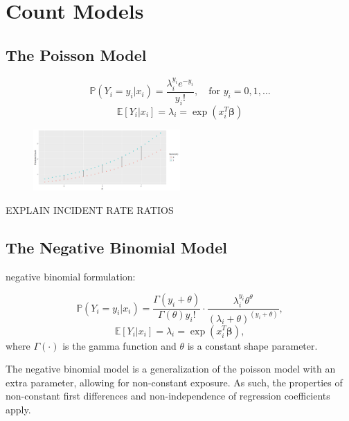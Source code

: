 \documentclass[jou, apacite]{apa6}
\begin{document}
\section{Count Models}

\subsection{The Poisson Model}

\begin{equation} \label{pois1}
\mathbb{P}(Y_i = y_i|x_i) = \dfrac{\lambda_i^{y_i}e^{-y_i}}{y_i!}, \quad\text{for } y_i = 0, 1, \dots
\end{equation}
\begin{equation} \label{pois2}
\mathbb{E}[Y_i|x_i] = \lambda_i = \exp (x_i^T \bm{\beta})
\end{equation}

\begin{figure}[h]
\includegraphics[width=0.5\textwidth]{PoissonFirstDiff.png}
\end{figure}
EXPLAIN INCIDENT RATE RATIOS

\subsection{The Negative Binomial Model}

negative binomial formulation:

\begin{equation}
\mathbb{P}(Y_i = y_i | x_i) = \dfrac{\Gamma(y_i + \theta)}{\Gamma(\theta)y_i!}
  \cdot
  \dfrac{\lambda_i^{y_i}\theta^{\theta}}{(\lambda_i + \theta)^{(y_i + \theta)}},
\end{equation}
\begin{equation}
\mathbb{E}[Y_i|x_i] = \lambda_i = \exp (x_i^T \bm{\beta}),
\end{equation}
where $\Gamma(\cdot)$ is the gamma function and $\theta$ is a constant shape parameter.

The negative binomial model is a generalization of the poisson model with an extra parameter, allowing for non-constant exposure. As such, the properties of non-constant first differences and non-independence of regression coefficients apply. 
\end{document}
